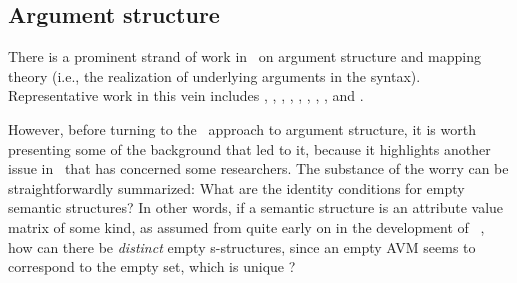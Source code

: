 \documentclass[output=paper,hidelinks]{langscibook}
\begin{document}
\subsection{Argument structure}



There is a prominent strand of work in \glues\ on argument structure
and mapping theory (i.e., the realization of underlying arguments in
the syntax). Representative work in this vein includes
\citet{arnold;sadler12}, 
\citet{AsudGior12}, \citet{asudeh2014meaning}, \citet{asudeh:unrealized},
\citet{findlay14-mphil,findlay2017mapping,Findlay2020},
\citet{Lowe2015,lowe19-cp}, \citet{lowe;birahimani19},
\citet{Przep17a}, and \citet{Lovestrand2020}.

However, before turning to the \glue\ approach to argument structure, it is
worth presenting some of the background that led to it, because it
highlights another issue in \glues\ that has concerned some
researchers. The substance of the worry can be straightforwardly
summarized: What are the identity conditions for empty semantic
structures? In other words, if a semantic structure is an attribute
value matrix of some kind, as assumed from quite early on in the
development of \glues\ \citep{dalrymple;ea99c,dalrymple01}, how can
there be \emph{distinct} empty s-structures, since an empty AVM seems
to correspond to the empty set, which is unique \citep{kokkonidis08,findlay2021}? 
\end{document}
